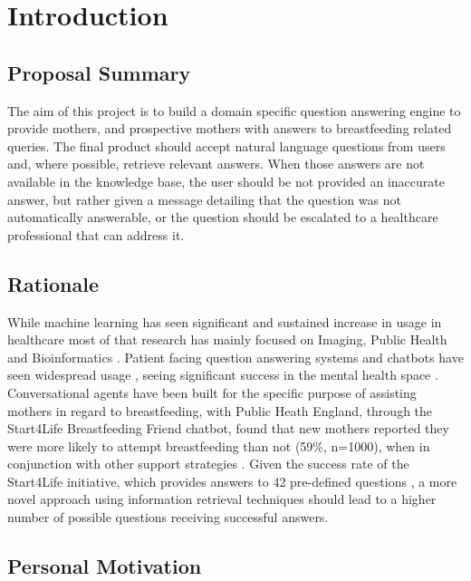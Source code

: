 \chapter{Introduction}


\label{chapter:introduction}


\section{Proposal Summary}

The aim of this project is to build a domain specific question answering engine to provide mothers, and prospective mothers with answers to breastfeeding related queries. The final product should accept natural language questions from users and, where possible, retrieve relevant answers. When those answers are not available in the knowledge base, the user should be not provided an inaccurate answer, but rather given a message detailing that the question was not automatically answerable, or the question should be escalated to a healthcare professional that can address it.


\section{Rationale}

While machine learning has seen significant and sustained increase in usage in healthcare most of that research has mainly focused on Imaging, Public Health and Bioinformatics \cite{7801947}. Patient facing question answering systems and chatbots have seen widespread usage \cite{doi/10.2196/18301}, seeing significant success in the mental health space \cite{doi/10.2196/jmir.7023}. Conversational agents have been built for the specific purpose of assisting mothers in regard to breastfeeding, with Public Heath England, through the Start4Life Breastfeeding Friend chatbot, found that new mothers reported they were more likely to attempt breastfeeding than not (59\%, n=1000), when in conjunction with other support strategies \cite{phe.start4life}. Given the success rate of the Start4Life initiative, which provides answers to 42 pre-defined questions \cite{start4life.faq}, a more novel approach using information retrieval techniques should lead to a higher number of possible questions receiving successful answers.

\section{Personal Motivation}

